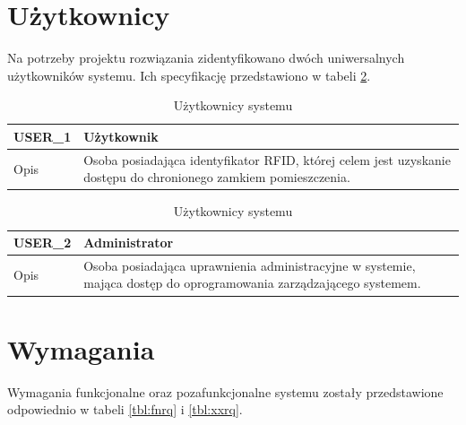     \section{Użytkownicy}
        Na potrzeby projektu rozwiązania zidentyfikowano dwóch uniwersalnych użytkowników systemu. Ich specyfikację przedstawiono w tabeli \ref{tbl:users}.

        \begin{table}[h!]
            \caption{Użytkownicy systemu}
            \centering
            \begin{subtable}[c]{\textwidth}
                \centering
                \begin{tabular}{p{2cm}|p{12cm}}
                    USER\_1      & \textbf{Użytkownik} \\
                    \hline Opis         & Osoba posiadająca identyfikator RFID, której celem jest uzyskanie dostępu do chronionego zamkiem pomieszczenia.  \\
                \end{tabular}
                \label{tbl:usr1}
                \vspace{10mm}           
            \end{subtable}
        \quad%
            \begin{subtable}[c]{\textwidth}
                \centering
                \begin{tabular}{p{2cm}|p{12cm}}
                    USER\_2      & \textbf{Administrator} \\
                    \hline Opis         & Osoba posiadająca uprawnienia administracyjne w systemie, mająca dostęp do oprogramowania zarządzającego systemem. \\
                \end{tabular}
                \label{tbl:usr2}       
            \end{subtable}                
            \label{tbl:users}
        \end{table}

    \newpage

    \section{Wymagania}

        Wymagania funkcjonalne oraz pozafunkcjonalne systemu zostały przedstawione odpowiednio w tabeli \ref{tbl:fnrq} i \ref{tbl:xxrq}.

